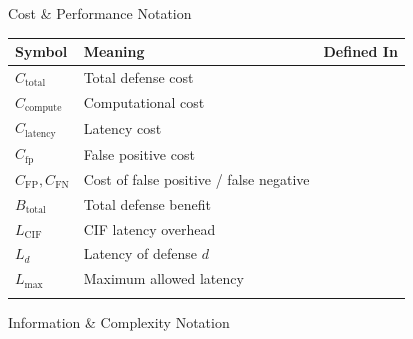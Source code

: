\documentclass[
  ignorenonframetext,
]{beamer}
\newcounter{none} %
\providecommand{\cref}[1]{\texttt{\detokenize{#1}}}
\begin{document}
\begin{frame}[allowframebreaks]{Cost \& Performance Notation}
{\def\LTcaptype{none} %
\begin{longtable}[]{@{}
  >{\raggedright\arraybackslash}p{}
  >{\raggedright\arraybackslash}p{}
  >{\raggedright\arraybackslash}p{}@{}}
\toprule\noalign{}
\begin{minipage}[b]{\linewidth}\raggedright
Symbol
\end{minipage} & \begin{minipage}[b]{\linewidth}\raggedright
Meaning
\end{minipage} & \begin{minipage}[b]{\linewidth}\raggedright
Defined In
\end{minipage} \\
\midrule\noalign{}
\endhead
\(C_{\text{total}}\) & Total defense cost & \cref{def:defense-cost} \\
\(C_{\text{compute}}\) & Computational cost &
\cref{tab:cost-components} \\
\(C_{\text{latency}}\) & Latency cost & \cref{tab:cost-components} \\
\(C_{\text{fp}}\) & False positive cost & \cref{tab:cost-components} \\
\(C_{\text{FP}}, C_{\text{FN}}\) & Cost of false positive / false
negative & \cref{def:cost-threshold} \\
\(B_{\text{total}}\) & Total defense benefit &
\cref{def:defense-benefit} \\
\(L_{\text{CIF}}\) & CIF latency overhead &
\cref{thm:latency-overhead} \\
\(L_d\) & Latency of defense \(d\) & \cref{eq:latency-budget} \\
\(L_{\max}\) & Maximum allowed latency & \cref{eq:latency-budget} \\
\bottomrule\noalign{}
\end{longtable}
}
\end{frame}

\begin{frame}[allowframebreaks]{Information \& Complexity Notation}
\protect{}\label{information-complexity-notation}
\end{frame}
\end{document}
